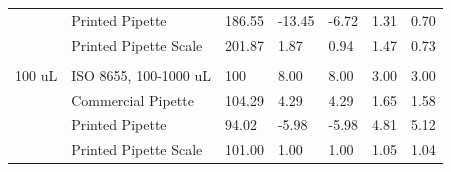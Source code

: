 \documentclass[10pt,letterpaper]{article}
\begin{document}
\begin{table}[!ht]
\begin{adjustwidth}{-2.25in}{0in}
\begin{tabular}{lllllll}
        & Printed Pipette       & 186.55  & -13.45           & -6.72        & 1.31         & 0.70          \\
        & Printed Pipette Scale & 201.87  & 1.87             & 0.94         & 1.47         & 0.73          \\
        &                       &         &                  &              &              &               \\
100 uL  & ISO 8655, 100-1000 uL & 100     & 8.00             & 8.00         & 3.00         & 3.00          \\
        & Commercial Pipette    & 104.29  & 4.29             & 4.29         & 1.65         & 1.58          \\
        & Printed Pipette       & 94.02   & -5.98            & -5.98        & 4.81         & 5.12          \\
        & Printed Pipette Scale & 101.00  & 1.00             & 1.00         & 1.05         & 1.04         
\end{tabular}
\end{adjustwidth}
\end{table}
\end{document}
